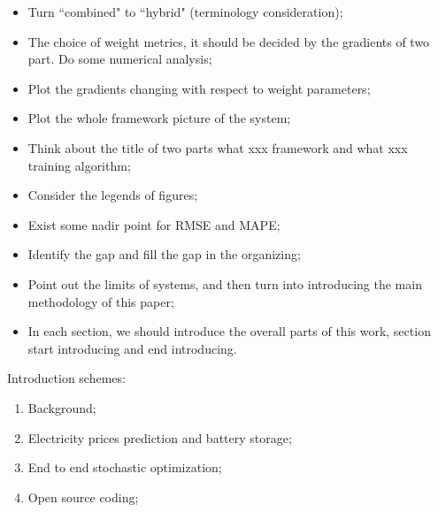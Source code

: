 \documentclass[journal]{IEEEtran}
\newcommand{\slw}{\color{blue}}
\begin{document}
\begin{itemize}
  \item Turn {\slw ``combined"} to {\slw ``hybrid"} (terminology consideration);
  \item {\slw The choice of weight metrics, it should be decided by the gradients of two part. Do some numerical analysis};
  \item {\slw Plot the gradients changing with respect to weight parameters};
  \item {\slw Plot the whole framework picture of the system};
  \item Think about the title of two parts {\slw what xxx framework} and {\slw what xxx training algorithm};
  \item {\slw Consider the legends of figures; }
  \item {\slw Exist some nadir point for RMSE and MAPE;}
  \item {\slw Identify the gap and fill the gap in the organizing;}
  \item {\slw Point out the limits of systems, and then turn into introducing the main methodology of this paper;}
  \item {\slw In each section, we should introduce the overall parts of this work, section start introducing and end introducing.}
\end{itemize}

Introduction schemes:
\begin{enumerate}
  \item Background;
  \item Electricity prices prediction and battery storage;
  \item End to end stochastic optimization;
  \item Open source coding;
\end{enumerate}



\ifCLASSOPTIONcaptionsoff
  \newpage
\fi
\end{document}
